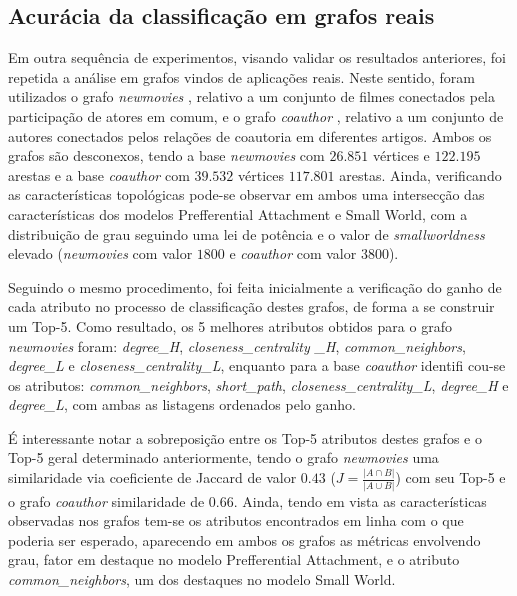 \documentclass[a4paper,11pt]{article}
\begin{document}
\vspace{0.3cm}
\subsection{Acurácia da classificação em grafos reais}
\vspace{0.3cm}

Em outra sequência de experimentos, visando validar os resultados anteriores, foi repetida a análise em grafos vindos de aplicações reais. Neste sentido, foram utilizados o grafo \textit{newmovies} \cite{Tang09}, relativo a um conjunto de filmes conectados pela participação de atores em comum, e o grafo \textit{coauthor} \cite{Wang11}, relativo a um conjunto de autores conectados pelos relações de coautoria em diferentes artigos. 
%
Ambos os grafos são desconexos, tendo a base \textit{newmovies} com $26.851$ vértices e $122.195$ arestas e a base \textit{coauthor} com $39.532$ vértices $117.801$ arestas. Ainda, verificando as características topológicas pode-se observar em ambos uma intersecção das características dos modelos Prefferential Attachment e Small World, com a distribuição de grau seguindo uma lei de potência e o valor de \textit{smallworldness} elevado (\textit{newmovies} com valor $1800$ e \textit{coauthor} com valor $3800$).

Seguindo o mesmo procedimento, foi feita inicialmente a verificação do ganho de cada atributo no processo de classificação destes grafos, de forma a se construir um Top-5. Como resultado, os 5 melhores atributos obtidos para o grafo \textit{newmovies} foram: \textit{degree\_H}, \textit{closeness\_centrality \_H}, \textit{common\_neighbors}, \textit{degree\_L} e \textit{closeness\_centrality\_L}, enquanto para a base \textit{coauthor} identifi cou-se os atributos: \textit{common\_neighbors}, \textit{short\_path}, \textit{closeness\_centrality\_L}, \textit{degree\_H} e \textit{degree\_L}, com ambas as listagens ordenados pelo ganho.

É interessante notar a sobreposição entre os Top-5 atributos destes grafos e o Top-5 geral determinado anteriormente, tendo o grafo \textit{newmovies} uma similaridade via coeficiente de Jaccard de valor $0.43$ ($J=\frac{|A \cap B|}{|A \cup B|}$) com seu Top-5 e o grafo \textit{coauthor} similaridade de $0.66$. Ainda, tendo em vista as características observadas nos grafos tem-se os atributos encontrados em linha com o que poderia ser esperado, aparecendo em ambos os grafos as métricas envolvendo grau, fator em destaque no modelo Prefferential Attachment, e o atributo \textit{common\_neighbors}, um dos destaques no modelo Small World.
\end{document}
